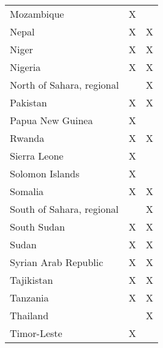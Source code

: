 \begin{table}[htbp]
\begin{tabular}{lcc}
		Mozambique                              & \cellcolor[HTML]{FFF2CC}X &                           \\
		Nepal                                   & \cellcolor[HTML]{E2EFD9}X & \cellcolor[HTML]{E2EFD9}X \\
		Niger                                   & \cellcolor[HTML]{E2EFD9}X & \cellcolor[HTML]{E2EFD9}X \\
		Nigeria                                 & \cellcolor[HTML]{E2EFD9}X & \cellcolor[HTML]{E2EFD9}X \\
		North of   Sahara, regional             &                           & \cellcolor[HTML]{FBE4D5}X \\
		Pakistan                                & \cellcolor[HTML]{E2EFD9}X & \cellcolor[HTML]{E2EFD9}X \\
		Papua   New Guinea                      & \cellcolor[HTML]{FFF2CC}X &                           \\
		Rwanda                                  & \cellcolor[HTML]{E2EFD9}X & \cellcolor[HTML]{E2EFD9}X \\
		Sierra   Leone                          & \cellcolor[HTML]{FFF2CC}X &                           \\
		Solomon   Islands                       & \cellcolor[HTML]{FFF2CC}X &                           \\
		Somalia                                 & \cellcolor[HTML]{E2EFD9}X & \cellcolor[HTML]{E2EFD9}X \\
		South of   Sahara, regional             &                           & \cellcolor[HTML]{FBE4D5}X \\
		South   Sudan                           & \cellcolor[HTML]{E2EFD9}X & \cellcolor[HTML]{E2EFD9}X \\
		Sudan                                   & \cellcolor[HTML]{E2EFD9}X & \cellcolor[HTML]{E2EFD9}X \\
		Syrian   Arab Republic                  & \cellcolor[HTML]{E2EFD9}X & \cellcolor[HTML]{E2EFD9}X \\
		Tajikistan                              & \cellcolor[HTML]{E2EFD9}X & \cellcolor[HTML]{E2EFD9}X \\
		Tanzania                                & \cellcolor[HTML]{E2EFD9}X & \cellcolor[HTML]{E2EFD9}X \\
		Thailand                                &                           & \cellcolor[HTML]{FBE4D5}X \\
		Timor-Leste                             & \cellcolor[HTML]{FFF2CC}X &                           \\

\end{tabular}
\end{table}
